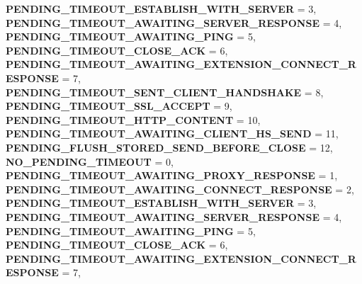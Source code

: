 \begin{DoxyCompactItemize}
\newline
{\bfseries P\+E\+N\+D\+I\+N\+G\+\_\+\+T\+I\+M\+E\+O\+U\+T\+\_\+\+E\+S\+T\+A\+B\+L\+I\+S\+H\+\_\+\+W\+I\+T\+H\+\_\+\+S\+E\+R\+V\+ER} = 3, 
{\bfseries P\+E\+N\+D\+I\+N\+G\+\_\+\+T\+I\+M\+E\+O\+U\+T\+\_\+\+A\+W\+A\+I\+T\+I\+N\+G\+\_\+\+S\+E\+R\+V\+E\+R\+\_\+\+R\+E\+S\+P\+O\+N\+SE} = 4, 
{\bfseries P\+E\+N\+D\+I\+N\+G\+\_\+\+T\+I\+M\+E\+O\+U\+T\+\_\+\+A\+W\+A\+I\+T\+I\+N\+G\+\_\+\+P\+I\+NG} = 5, 
{\bfseries P\+E\+N\+D\+I\+N\+G\+\_\+\+T\+I\+M\+E\+O\+U\+T\+\_\+\+C\+L\+O\+S\+E\+\_\+\+A\+CK} = 6, 
\newline
{\bfseries P\+E\+N\+D\+I\+N\+G\+\_\+\+T\+I\+M\+E\+O\+U\+T\+\_\+\+A\+W\+A\+I\+T\+I\+N\+G\+\_\+\+E\+X\+T\+E\+N\+S\+I\+O\+N\+\_\+\+C\+O\+N\+N\+E\+C\+T\+\_\+\+R\+E\+S\+P\+O\+N\+SE} = 7, 
{\bfseries P\+E\+N\+D\+I\+N\+G\+\_\+\+T\+I\+M\+E\+O\+U\+T\+\_\+\+S\+E\+N\+T\+\_\+\+C\+L\+I\+E\+N\+T\+\_\+\+H\+A\+N\+D\+S\+H\+A\+KE} = 8, 
{\bfseries P\+E\+N\+D\+I\+N\+G\+\_\+\+T\+I\+M\+E\+O\+U\+T\+\_\+\+S\+S\+L\+\_\+\+A\+C\+C\+E\+PT} = 9, 
{\bfseries P\+E\+N\+D\+I\+N\+G\+\_\+\+T\+I\+M\+E\+O\+U\+T\+\_\+\+H\+T\+T\+P\+\_\+\+C\+O\+N\+T\+E\+NT} = 10, 
\newline
{\bfseries P\+E\+N\+D\+I\+N\+G\+\_\+\+T\+I\+M\+E\+O\+U\+T\+\_\+\+A\+W\+A\+I\+T\+I\+N\+G\+\_\+\+C\+L\+I\+E\+N\+T\+\_\+\+H\+S\+\_\+\+S\+E\+ND} = 11, 
{\bfseries P\+E\+N\+D\+I\+N\+G\+\_\+\+F\+L\+U\+S\+H\+\_\+\+S\+T\+O\+R\+E\+D\+\_\+\+S\+E\+N\+D\+\_\+\+B\+E\+F\+O\+R\+E\+\_\+\+C\+L\+O\+SE} = 12, 
{\bfseries N\+O\+\_\+\+P\+E\+N\+D\+I\+N\+G\+\_\+\+T\+I\+M\+E\+O\+UT} = 0, 
{\bfseries P\+E\+N\+D\+I\+N\+G\+\_\+\+T\+I\+M\+E\+O\+U\+T\+\_\+\+A\+W\+A\+I\+T\+I\+N\+G\+\_\+\+P\+R\+O\+X\+Y\+\_\+\+R\+E\+S\+P\+O\+N\+SE} = 1, 
\newline
{\bfseries P\+E\+N\+D\+I\+N\+G\+\_\+\+T\+I\+M\+E\+O\+U\+T\+\_\+\+A\+W\+A\+I\+T\+I\+N\+G\+\_\+\+C\+O\+N\+N\+E\+C\+T\+\_\+\+R\+E\+S\+P\+O\+N\+SE} = 2, 
{\bfseries P\+E\+N\+D\+I\+N\+G\+\_\+\+T\+I\+M\+E\+O\+U\+T\+\_\+\+E\+S\+T\+A\+B\+L\+I\+S\+H\+\_\+\+W\+I\+T\+H\+\_\+\+S\+E\+R\+V\+ER} = 3, 
{\bfseries P\+E\+N\+D\+I\+N\+G\+\_\+\+T\+I\+M\+E\+O\+U\+T\+\_\+\+A\+W\+A\+I\+T\+I\+N\+G\+\_\+\+S\+E\+R\+V\+E\+R\+\_\+\+R\+E\+S\+P\+O\+N\+SE} = 4, 
{\bfseries P\+E\+N\+D\+I\+N\+G\+\_\+\+T\+I\+M\+E\+O\+U\+T\+\_\+\+A\+W\+A\+I\+T\+I\+N\+G\+\_\+\+P\+I\+NG} = 5, 
\newline
{\bfseries P\+E\+N\+D\+I\+N\+G\+\_\+\+T\+I\+M\+E\+O\+U\+T\+\_\+\+C\+L\+O\+S\+E\+\_\+\+A\+CK} = 6, 
{\bfseries P\+E\+N\+D\+I\+N\+G\+\_\+\+T\+I\+M\+E\+O\+U\+T\+\_\+\+A\+W\+A\+I\+T\+I\+N\+G\+\_\+\+E\+X\+T\+E\+N\+S\+I\+O\+N\+\_\+\+C\+O\+N\+N\+E\+C\+T\+\_\+\+R\+E\+S\+P\+O\+N\+SE} = 7, 

\end{DoxyCompactItemize}
